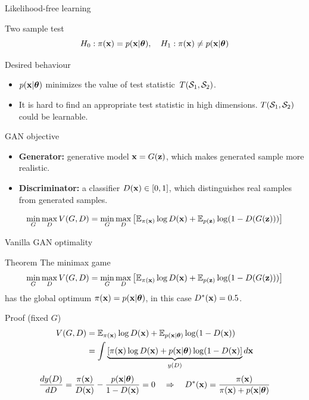 \begin{frame}{Likelihood-free learning}
	\begin{block}{Two sample test}
		\vspace{-0.5cm}
		\[
			H_0: \pi(\mathbf{x}) = p(\mathbf{x} | \boldsymbol{\theta}), \quad H_1: \pi(\mathbf{x}) \neq p(\mathbf{x} | \boldsymbol{\theta})
		\]
		\vspace{-0.8cm}
	\end{block}
	\begin{block}{Desired behaviour}
		\begin{itemize}
			\item $p(\mathbf{x} | \boldsymbol{\theta})$ minimizes the value of test statistic~$T(\mathcal{S}_1, \mathcal{S}_2)$.
			\item It is hard to find an appropriate test statistic in high dimensions. $T(\mathcal{S}_1, \mathcal{S}_2)$ could be learnable.
		\end{itemize}
	\end{block}
	\vspace{-0.3cm}
	\begin{block}{GAN objective}
		\begin{itemize}
			\item \textbf{Generator:} generative model $\mathbf{x} = G(\mathbf{z})$, which makes generated sample more realistic.
			\item \textbf{Discriminator:} a classifier $D(\mathbf{x}) \in [0, 1]$, which distinguishes real samples from generated samples.
		\end{itemize}
		\[
			\min_{G} \max_D V(G, D) = \min_{G} \max_D \left[ \mathbb{E}_{\pi(\mathbf{x})} \log D(\mathbf{x}) + \mathbb{E}_{p(\mathbf{z})} \log (1 - D(G(\mathbf{z}))) \right]
		\]
	\end{block}
\end{frame}
\begin{frame}{Vanilla GAN optimality}
	\begin{block}{Theorem}
	The minimax game 
		\vspace{-0.1cm}
		\[
			\min_{G} \max_D V(G, D) = \min_{G} \max_D \left[ \mathbb{E}_{\pi(\mathbf{x})} \log D(\mathbf{x}) + \mathbb{E}_{p(\mathbf{z})} \log (1 - D(G(\mathbf{z}))) \right]
		\]
	has the global optimum $\pi(\mathbf{x}) = p(\mathbf{x} | \boldsymbol{\theta})$, in this case $D^*(\mathbf{x}) = 0.5$.
	\end{block}
	\begin{block}{Proof (fixed $G$)}
		\vspace{-0.5cm}
		\begin{align*}
			V(G, D) &= \mathbb{E}_{\pi(\mathbf{x})} \log D(\mathbf{x}) + \mathbb{E}_{p(\mathbf{x} | \boldsymbol{\theta})} \log (1 - D(\mathbf{x})) \\
			&= \int \underbrace{\left[ \pi(\mathbf{x}) \log D(\mathbf{x}) + p(\mathbf{x} | \boldsymbol{\theta})\log (1 - D(\mathbf{x}) \right]}_{y(D)} d \mathbf{x}
		\end{align*}
		\vspace{-0.2cm}
		\[
			\frac{d y(D)}{d D} = \frac{\pi(\mathbf{x})}{D(\mathbf{x})} - \frac{p(\mathbf{x} | \boldsymbol{\theta})}{1 - D(\mathbf{x})} = 0 \quad \Rightarrow \quad D^*(\mathbf{x}) = \frac{\pi(\mathbf{x})}{\pi(\mathbf{x}) + p(\mathbf{x} | \boldsymbol{\theta})}
		\]
	\end{block}
\end{frame}

